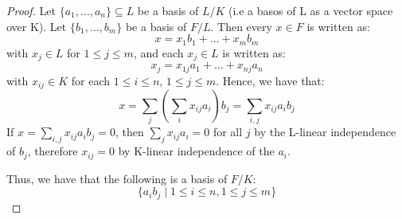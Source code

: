 \begin{proof}
  Let $\{a_1, \ldots, a_n \} \subseteq L$ be a basis of $L/K$ (i.e a basos of L as a vector space over K).
Let $\{ b_1, \ldots, b_m \}$ be a basis of $F/L$. Then every $x \in F$ is written as:
\begin{equation*}
  x = x_1b_1 + \ldots + x_mb_m
\end{equation*}
with $x_j \in L$ for $1 \leq j \leq m$, and each $x_j \in L$ is written as:
\begin{equation*}
  x_j = x_{1j}a_1 + \ldots + x_{nj}a_n
\end{equation*}
with $x_{ij} \in K$ for each $1 \leq i \leq n$, $1 \leq j \leq m$. Hence, we have that:
\begin{equation*}
  x = \sum_j\left(\sum_ix_{ij}a_i\right)b_j = \sum_{i, j}x_{ij}a_ib_j
\end{equation*}
If $x = \sum_{i, j}x_{ij}a_ib_j = 0$, then $\sum_j x_{ij}a_i = 0$ for all $j$ by the L-linear independence of $b_j$, therefore $x_{ij} = 0$ by K-linear independence of the $a_i$.

Thus, we have that the following is a basis of $F/K$:
\begin{equation*}
  \{ a_ib_j \mid 1 \leq i \leq n, 1 \leq j \leq m \}
\end{equation*}
\end{proof}






